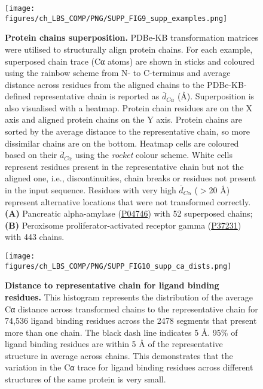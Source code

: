 \begin{figure}[htb!]
    \centering
    \texttt{[image: figures/ch\_LBS\_COMP/PNG/SUPP\_FIG9\_supp\_examples.png]}
    \caption[Protein chains superposition]{\textbf{Protein chains superposition.} PDBe-KB transformation matrices were utilised to structurally align protein chains. For each example, superposed chain trace (Cα atoms) are shown in sticks and coloured using the rainbow scheme from N- to C-terminus and average distance across residues from the aligned chains to the PDBe-KB-defined representative chain is reported as $\overline{d}_{C\alpha}$ (\AA{}). Superposition is also visualised with a heatmap. Protein chain residues are on the X axis and aligned protein chains on the Y axis. Protein chains are sorted by the average distance to the representative chain, so more dissimilar chains are on the bottom. Heatmap cells are coloured based on their $\overline{d}_{C\alpha}$ using the \textit{rocket} colour scheme. White cells represent residues present in the representative chain but not the aligned one, i.e., discontinuities, chain breaks or residues not present in the input sequence. Residues with very high $\overline{d}_{C\alpha}$  ($>$20 \AA{}) represent alternative locations that were not transformed correctly. \textbf{(A)} Pancreatic alpha-amylase (\href{https://www.uniprot.org/uniprotkb/P04746/entry}{P04746}) with 52 superposed chains; \textbf{(B)} Peroxisome proliferator-activated receptor gamma (\href{https://www.uniprot.org/uniprotkb/P37231/entry}{P37231}) with 443 chains.}
    \label{fig:protein_chain_supp}
\end{figure}

\begin{figure}[htb!]
    \centering
    \texttt{[image: figures/ch\_LBS\_COMP/PNG/SUPP\_FIG10\_supp\_ca\_dists.png]}
    \caption[Distance to representative chain for ligand binding residues]{\textbf{Distance to representative chain for ligand binding residues.} This histogram represents the distribution of the average Cα distance across transformed chains to the representative chain for 74,536 ligand binding residues across the 2478 segments that present more than one chain. The black dash line indicates 5 \AA{}. 95\% of ligand binding residues are within 5 \AA{} of the representative structure in average across chains. This demonstrates that the variation in the Cα trace for ligand binding residues across different structures of the same protein is very small.}
    \label{fig:supp_ca_dists}
\end{figure}

